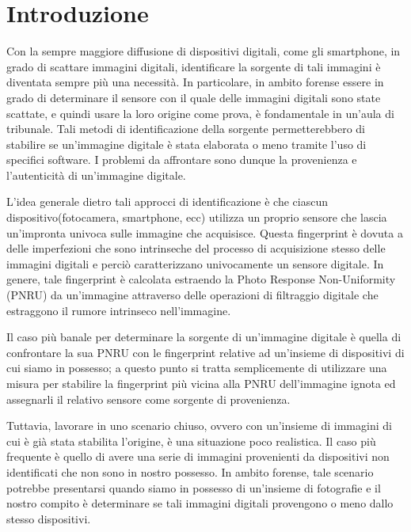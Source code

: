 \section{Introduzione}

Con la sempre maggiore diffusione di dispositivi digitali, come gli smartphone, in grado di scattare immagini digitali, identificare la sorgente di tali immagini è diventata sempre più una necessità. In particolare, in ambito forense essere in grado di determinare il sensore con il quale delle immagini digitali sono state scattate, e quindi usare la loro origine come prova, è fondamentale in un'aula di tribunale. Tali metodi di identificazione della sorgente permetterebbero di stabilire se un'immagine digitale è stata elaborata o meno tramite l'uso di specifici software. I problemi da affrontare sono dunque la provenienza e l'autenticità di un'immagine digitale.

L'idea generale dietro tali approcci di identificazione è che ciascun dispositivo(fotocamera, smartphone, ecc) utilizza un proprio sensore che lascia un'impronta univoca sulle immagine che acquisisce. Questa fingerprint è dovuta a delle imperfezioni che sono intrinseche del processo di acquisizione stesso delle immagini digitali e perciò caratterizzano univocamente un sensore digitale. In genere, tale fingerprint è calcolata estraendo la Photo Response Non-Uniformity (PNRU) da un'immagine attraverso delle operazioni di filtraggio digitale che estraggono il rumore intrinseco nell'immagine.

Il caso più banale per determinare la sorgente di un'immagine digitale è quella di confrontare la sua PNRU con le fingerprint relative ad un'insieme di dispositivi di cui siamo in possesso; a questo punto si tratta semplicemente di utilizzare una misura per stabilire la fingerprint più vicina alla PNRU dell'immagine ignota ed assegnarli il relativo sensore come sorgente di provenienza.

Tuttavia, lavorare in uno scenario chiuso, ovvero con un'insieme di immagini di cui è già stata stabilita l'origine, è una situazione poco realistica. Il caso più frequente è quello di avere una serie di immagini provenienti da dispositivi non identificati che non sono in nostro possesso. In ambito forense, tale scenario potrebbe presentarsi quando siamo in possesso di un'insieme di fotografie e il nostro compito è determinare se tali immagini digitali provengono o meno dallo stesso dispositivi.

